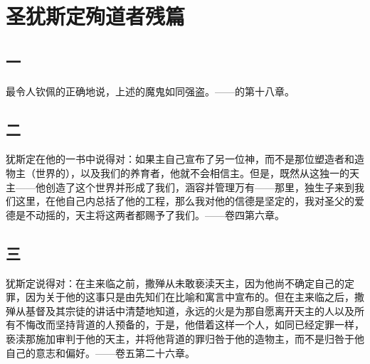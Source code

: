 
\chapter{圣犹斯定殉道者残篇}



\section{一}

最令人钦佩的正确地说，上述的魔鬼如同强盗。——的第十八章。\par


\section{二}

犹斯定在他的一书中说得对：如果主自己宣布了另一位神，而不是那位塑造者和造物主（世界的），以及我们的养育者，他就不会相信主。但是，既然从这独一的天主——他创造了这个世界并形成了我们，涵容并管理万有——那里，独生子来到我们这里，在他自己内总括了他的工程，那么我对他的信德是坚定的，我对圣父的爱德是不动摇的，天主将这两者都赐予了我们。——卷四第六章。\par


\section{三}

犹斯定说得对：在主来临之前，撒殚从未敢亵渎天主，因为他尚不确定自己的定罪，因为关于他的这事只是由先知们在比喻和寓言中宣布的。但在主来临之后，撒殚从基督及其宗徒的讲话中清楚地知道，永远的火是为那自愿离开天主的人以及所有不悔改而坚持背道的人预备的，于是，他借着这样一个人，如同已经定罪一样，亵渎那施加审判于他的天主，并将他背道的罪归咎于他的造物主，而不是归咎于他自己的意志和偏好。——卷五第二十六章。\par

